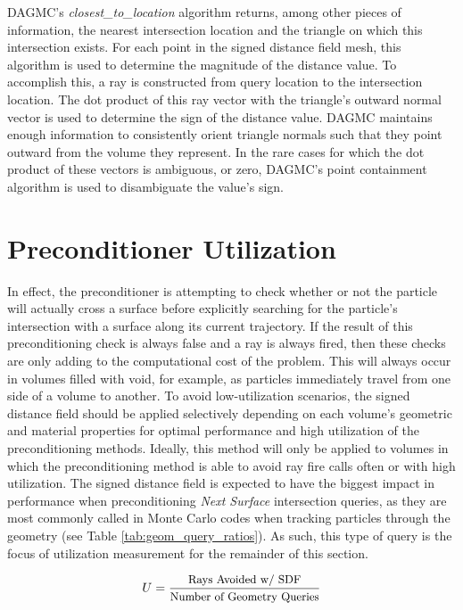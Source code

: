 DAGMC's \textit{closest\_to\_location} algorithm returns, among other pieces of
information, the nearest intersection location and the triangle on which this
intersection exists. For each point in the signed distance field mesh, this
algorithm is used to determine the magnitude of the distance value. To
accomplish this, a ray is constructed from query location to the intersection
location. The dot product of this ray vector with the triangle's outward normal
vector is used to determine the sign of the distance value. DAGMC maintains
enough information to consistently orient triangle normals such that they point
outward from the volume they represent. In the rare cases for which the dot
product of these vectors is ambiguous, or zero, DAGMC's point containment
algorithm is used to disambiguate the value's sign.

\section{Preconditioner Utilization}\label{sec:preconditioner_utilization}

In effect, the preconditioner is attempting to check whether or not the particle
will actually cross a surface before explicitly searching for the particle's
intersection with a surface along its current trajectory. If the result of this
preconditioning check is always false and a ray is always fired, then these
checks are only adding to the computational cost of the problem. This will
always occur in volumes filled with void, for example, as particles immediately
travel from one side of a volume to another. To avoid low-utilization scenarios,
the signed distance field should be applied selectively depending on each
volume's geometric and material properties for optimal performance and high
utilization of the preconditioning methods. Ideally, this method will only be
applied to volumes in which the preconditioning method is able to avoid ray fire
calls often or with high utilization. The signed distance field is expected to
have the biggest impact in performance when preconditioning \textit{Next Surface}
intersection queries, as they are most commonly called in Monte Carlo codes when
tracking  particles through the geometry (see Table
\ref{tab:geom_query_ratios}). As such, this type of query is the focus of
utilization measurement for the remainder of this section.


\begin{equation}
  U = \frac{ \small \text{Rays Avoided w/ SDF} }{ \small \text{Number of Geometry Queries} } 
   \label{eq:preconditioner_utilization}
\end{equation}

